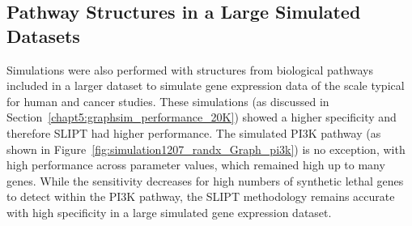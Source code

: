 \FloatBarrier

\subsection{Pathway Structures in a Large Simulated Datasets}
\label{chapt5:graphsim_performance_20K_pway}
\FloatBarrier

Simulations were also performed with  structures from biological pathways included in a larger dataset to simulate \gls{gene expression} data of the scale typical for human and cancer studies. These simulations (as discussed in Section~\ref{chapt5:graphsim_performance_20K}) showed a higher specificity and therefore \gls{SLIPT} had higher performance. The simulated \gls{PI3K} pathway (as shown in Figure~\ref{fig:simulation1207_randx_Graph_pi3k}) is no exception, with high performance across parameter values, which remained high up to many genes. While the sensitivity decreases for high numbers of \gls{synthetic lethal} genes to detect within the \gls{PI3K} pathway, the \gls{SLIPT} methodology remains accurate with high specificity in a large simulated \gls{gene expression} dataset. 


